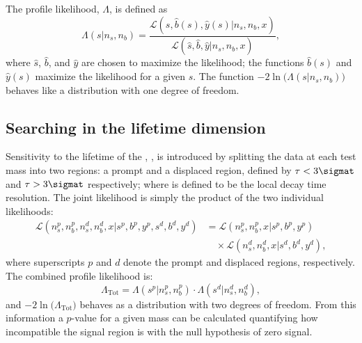
The profile likelihood, $\Lambda$, is defined as
\begin{equation}
  \Lambda(s|n_s,n_b) =
  \frac
  {\mathcal{L}(s, \hat{b}(s), \hat{y}(s) | n_s, n_b, x)}
  {\mathcal{L}(\hat{s}, \hat{b}, \hat{y} | n_s, n_b, x)},
  \label{eq:profilelike1}
\end{equation}
where $\hat{s}$, $\hat{b}$, and $\hat{y}$ are chosen to maximize the likelihood; the functions
$\hat{b}(s)$ and $\hat{y}(s)$ maximize the likelihood for a given $s$.
The function $-2\ln\big(\Lambda(s|n_s,n_b)\big)$ behaves like a \chisq distribution with one degree
of freedom.


\subsection{Searching in the lifetime dimension}
Sensitivity to the lifetime of the \db, \lifetime{\db}, is introduced by splitting the data at each
test mass into two regions: a prompt and a displaced region, defined by $\tau<3\sigmat$ and
$\tau>3\sigmat$ respectively; where \sigmat is defined to be the local decay time resolution.
The joint likelihood is simply the product of the two individual likelihoods:
\begin{align}
  \mathcal{L}(n^p_s, n^p_b, n^d_s, n^d_b, x | s^p, b^p, y^p, s^d, b^d, y^d) &=
  \mathcal{L}(n^p_s, n^p_b, x | s^p, b^p, y^p)\nonumber\\
  &\quad\times\mathcal{L}(n^d_s, n^d_b, x | s^d, b^d, y^d),
  \label{eq:db:liketau}
\end{align}
where superscripts $p$ and $d$ denote the prompt and displaced regions,
respectively.
The combined profile likelihood is:
\begin{equation}
  \Lambda_\mathrm{Tot}
  =
  \Lambda(s^p|n_s^p,n_b^p)\cdot
  \Lambda(s^d|n_s^d,n_b^d),
\end{equation}
and $-2\ln\big(\Lambda_\mathrm{Tot}\big)$ behaves as a \chisq distribution with two
degrees of freedom.
From this information a $p$-value for a given mass can be calculated
quantifying how incompatible the signal region is with the null
hypothesis of zero signal.

